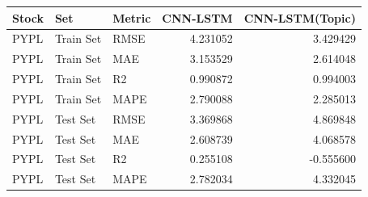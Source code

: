 \begin{tabular}{lllrr}
\toprule
Stock & Set & Metric & CNN-LSTM & CNN-LSTM(Topic) \\
\midrule
PYPL & Train Set & RMSE & 4.231052 & 3.429429 \\
PYPL & Train Set & MAE & 3.153529 & 2.614048 \\
PYPL & Train Set & R2 & 0.990872 & 0.994003 \\
PYPL & Train Set & MAPE & 2.790088 & 2.285013 \\
PYPL & Test Set & RMSE & 3.369868 & 4.869848 \\
PYPL & Test Set & MAE & 2.608739 & 4.068578 \\
PYPL & Test Set & R2 & 0.255108 & -0.555600 \\
PYPL & Test Set & MAPE & 2.782034 & 4.332045 \\
\bottomrule
\end{tabular}
